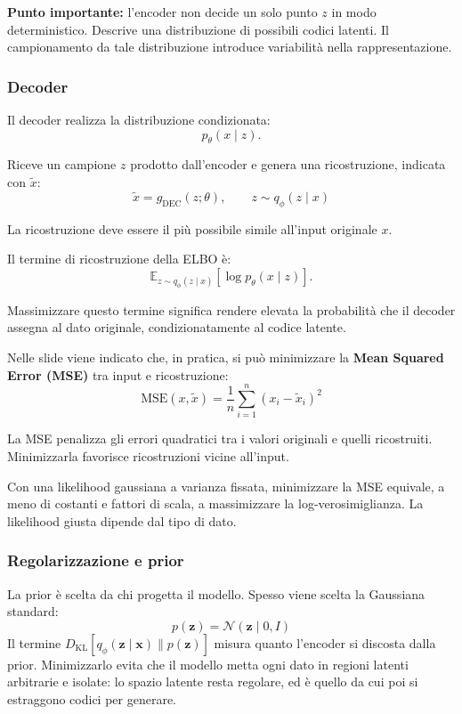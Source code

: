 \documentclass[11pt,a4paper]{article}
\providecommand{\E}{\mathbb{E}}
\providecommand{\DKL}{D_{\mathrm{KL}}}
\providecommand{\Normal}{\mathcal{N}}
\begin{document}
\textbf{Punto importante:} l'encoder non decide un solo punto $z$ in modo deterministico. Descrive una 
distribuzione di possibili codici latenti. Il campionamento da tale distribuzione introduce variabilità 
nella rappresentazione.


\subsubsection{Decoder}
Il decoder realizza la distribuzione condizionata:
\[
p_\theta(x\mid z).
\]

Riceve un campione $z$ prodotto dall'encoder e genera una ricostruzione, indicata con $\widetilde{x}$:
\[
\boxed{
\widetilde{x}=g_{\mathrm{DEC}}(z;\theta),
\qquad
z\sim q_\phi(z\mid x)
}
\]

La ricostruzione deve essere il più possibile simile all'input originale $x$.

Il termine di ricostruzione della ELBO è:
\[
\E_{z\sim q_\phi(z\mid x)}
[\log p_\theta(x\mid z)].
\]

Massimizzare questo termine significa rendere elevata la probabilità che il decoder assegna al dato originale,
 condizionatamente al codice latente.

Nelle slide viene indicato che, in pratica, si può minimizzare la \textbf{Mean Squared Error (MSE)} tra input
e ricostruzione:
\[
\boxed{
\mathrm{MSE}(x,\widetilde{x})
=
\frac{1}{n}\sum_{i=1}^{n}(x_i-\widetilde{x}_i)^2
}
\]

La MSE penalizza gli errori quadratici tra i valori originali e quelli ricostruiti. 
Minimizzarla favorisce ricostruzioni vicine all'input.
\begin{osservazione}
Con una likelihood gaussiana a varianza fissata, minimizzare la MSE equivale,
a meno di costanti e fattori di scala, a massimizzare la log-verosimiglianza. La
likelihood giusta dipende dal tipo di dato.
\end{osservazione}

\subsubsection{Regolarizzazione e prior}
La prior è scelta da chi progetta il modello. Spesso viene scelta la
Gaussiana standard:
\[
\boxed{p(\mathbf{z})=\Normal(\mathbf{z}\mid 0,I)}
\]
Il termine $\DKL[q_\phi(\mathbf{z}\mid\mathbf{x})\|p(\mathbf{z})]$ misura quanto
l'encoder si discosta dalla prior. Minimizzarlo evita che il modello metta ogni
dato in regioni latenti arbitrarie e isolate: lo spazio latente resta regolare,
ed è quello da cui poi si estraggono codici per generare.
\end{document}

